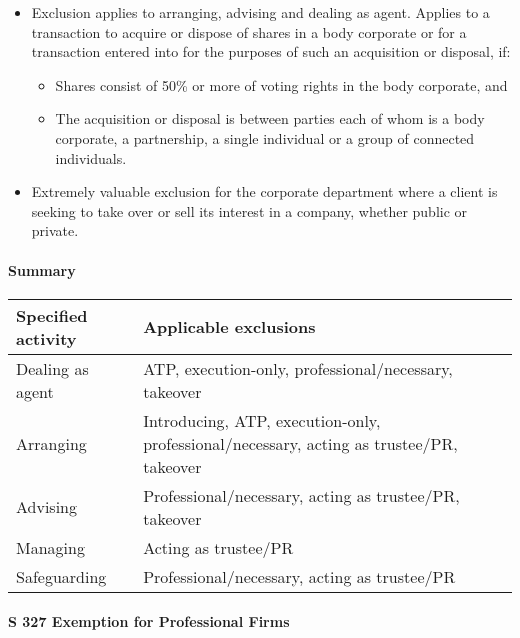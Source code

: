 \documentclass[
]{article}
\providecommand{\tightlist}{%
  \setlength{\itemsep}{0pt}\setlength{\parskip}{0pt}}
\begin{document}
\begin{itemize}
  \begin{itemize}
  \tightlist
  \item
    Exclusion applies to arranging, advising and dealing as agent.
    Applies to a transaction to acquire or dispose of shares in a body
    corporate or for a transaction entered into for the purposes of such
    an acquisition or disposal, if:

    \begin{itemize}
    \tightlist
    \item
      Shares consist of 50\% or more of voting rights in the body
      corporate, and
    \item
      The acquisition or disposal is between parties each of whom is a
      body corporate, a partnership, a single individual or a group of
      connected individuals.
    \end{itemize}
  \item
    Extremely valuable exclusion for the corporate department where a
    client is seeking to take over or sell its interest in a company,
    whether public or private.
  \end{itemize}
\end{itemize}

\hypertarget{summary-1}{%
\paragraph{Summary}\label{summary-1}}

\begin{longtable}[]{@{}ll@{}}
\toprule()
Specified activity & Applicable exclusions \\
\midrule()
\endhead
Dealing as agent & ATP, execution-only, professional/necessary,
takeover \\
Arranging & Introducing, ATP, execution-only, professional/necessary,
acting as trustee/PR, takeover \\
Advising & Professional/necessary, acting as trustee/PR, takeover \\
Managing & Acting as trustee/PR \\
Safeguarding & Professional/necessary, acting as trustee/PR \\
\bottomrule()
\end{longtable}

\hypertarget{s-327-exemption-for-professional-firms}{%
\paragraph{S 327 Exemption for Professional
Firms}\label{s-327-exemption-for-professional-firms}}
\end{document}
